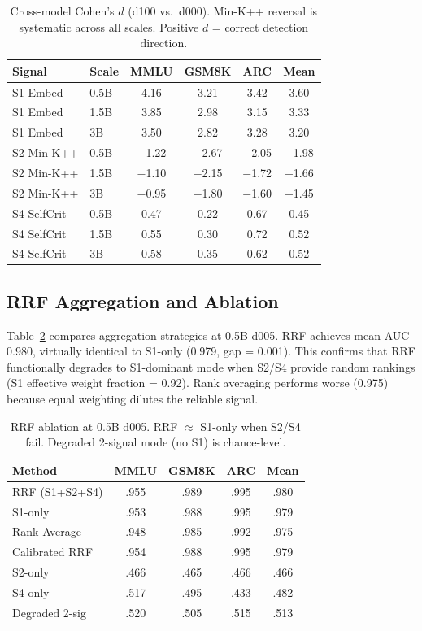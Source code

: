 \documentclass[11pt,a4paper]{article}
\begin{document}
\begin{table}[t]
\centering
\small
\caption{Cross-model Cohen's $d$ (d100 vs.\ d000). Min-K++ reversal is systematic across all scales. Positive $d$ = correct detection direction.}
\label{tab:cohens_d}
\begin{tabular}{llcccc}
\toprule
Signal & Scale & MMLU & GSM8K & ARC & Mean \\
\midrule
S1 Embed & 0.5B & 4.16 & 3.21 & 3.42 & 3.60 \\
S1 Embed & 1.5B & 3.85 & 2.98 & 3.15 & 3.33 \\
S1 Embed & 3B & 3.50 & 2.82 & 3.28 & 3.20 \\
\midrule
S2 Min-K++ & 0.5B & $-$1.22 & $-$2.67 & $-$2.05 & $-$1.98 \\
S2 Min-K++ & 1.5B & $-$1.10 & $-$2.15 & $-$1.72 & $-$1.66 \\
S2 Min-K++ & 3B & $-$0.95 & $-$1.80 & $-$1.60 & $-$1.45 \\
\midrule
S4 SelfCrit & 0.5B & 0.47 & 0.22 & 0.67 & 0.45 \\
S4 SelfCrit & 1.5B & 0.55 & 0.30 & 0.72 & 0.52 \\
S4 SelfCrit & 3B & 0.58 & 0.35 & 0.62 & 0.52 \\
\bottomrule
\end{tabular}
\end{table}

\subsection{RRF Aggregation and Ablation}
\label{sec:rrf_results}

Table~\ref{tab:rrf_ablation} compares aggregation strategies at 0.5B d005. RRF achieves mean AUC 0.980, virtually identical to S1-only (0.979, gap = 0.001). This confirms that RRF functionally degrades to S1-dominant mode when S2/S4 provide random rankings (S1 effective weight fraction = 0.92). Rank averaging performs worse (0.975) because equal weighting dilutes the reliable signal.

\begin{table}[t]
\centering
\small
\caption{RRF ablation at 0.5B d005. RRF $\approx$ S1-only when S2/S4 fail. Degraded 2-signal mode (no S1) is chance-level.}
\label{tab:rrf_ablation}
\begin{tabular}{lcccc}
\toprule
Method & MMLU & GSM8K & ARC & Mean \\
\midrule
RRF (S1+S2+S4) & .955 & .989 & .995 & .980 \\
S1-only & .953 & .988 & .995 & .979 \\
Rank Average & .948 & .985 & .992 & .975 \\
Calibrated RRF & .954 & .988 & .995 & .979 \\
\midrule
S2-only & .466 & .465 & .466 & .466 \\
S4-only & .517 & .495 & .433 & .482 \\
Degraded 2-sig & .520 & .505 & .515 & .513 \\
\bottomrule
\end{tabular}
\end{table}
\end{document}
